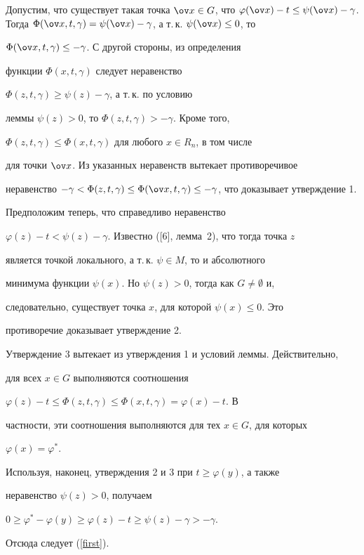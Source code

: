 \begin{pf}


Допустим, что существует такая точка $\ov x \in


G$, что $\varphi(\ov x)-t\le\psi(\ov x)-\gamma$. Тогда $\Phi(\ov


x,t,\gamma)=\psi (\ov x)-\gamma$, а т.\,к. $\psi (\ov x)\le0$, то


$\Phi (\ov x,t,\gamma)\le-\gamma$. С другой стороны, из определения


функции $\Phi(x,t,\gamma)$ следует неравенство


$\Phi(z,t,\gamma)\ge\psi(z)-\gamma$, а т.\,к. по условию


леммы ${\psi(z)>0}$, то $\Phi(z,t,\gamma)>-\gamma$. Кроме того,


$\Phi(z,t,\gamma)\le\Phi(x,t,\gamma)$ для любого $x\in R_n$, в том числе


для точки $\ov x$. Из указанных неравенств вытекает противоречивое


неравенство $-\gamma<\Phi(z,t,\gamma)\le\Phi(\ov


x,t,\gamma)\le-\gamma$, что доказывает утверждение 1.





Предположим теперь, что справедливо неравенство


$\varphi(z)-t<\psi(z)-\gamma$. Известно ([6], лемма~2), что тогда точка $z$


является точкой локального, а т.\,к. $\psi\in M$, то и абсолютного


минимума функции $\psi(x)$. Но $\psi(z)>0$, тогда как $G\ne\emptyset$ и,


следовательно, существует точка $x$, для которой $\psi(x)\le0$. Это


противоречие доказывает утверждение 2.





Утверждение 3 вытекает из утверждения 1 и условий леммы. Действительно,


для всех $x\in G$ выполняются соотношения


$\varphi(z)-t\le\Phi(z,t,\gamma)\le\Phi(x,t,\gamma)=\varphi(x)-t$. В


частности, эти соотношения выполняются для тех $x\in G$, для которых


$\varphi(x)=\varphi^*$.





Используя, наконец, утверждения 2 и 3 при $t\ge\varphi(y)$, а также


неравенство $\psi(z)>0$, получаем


$0\ge\varphi^*-\varphi(y)\ge\varphi(z)-t\ge\psi(z)-\gamma>-\gamma$.


Отсюда следует (\ref{first}).


\end{pf}





